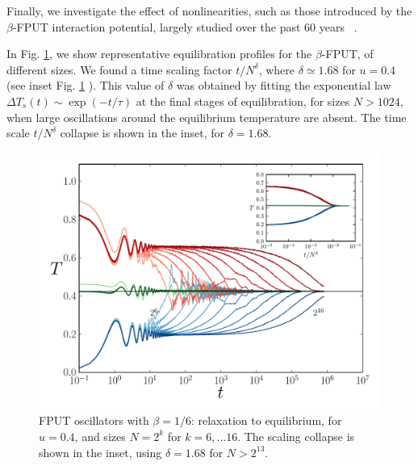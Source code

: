 \documentclass[aps,pre,showpacs,twocolumn,superscriptaddress,floatfix]{revtex4-1}
\begin{document}
Finally, we investigate the effect of nonlinearities, such as those introduced 
by the  $\beta$-FPUT interaction potential, 
largely studied over the past 60 years ~\cite{BermanIzrailev2005Report,Dauxois2008PhysToday}. 
{


In Fig. \ref{fig:TempLogt_FPU__U}, we show  representative   
equilibration profiles for  the $\beta$-FPUT, 
of different sizes.
%
We found a time scaling factor $t/N^\delta$, where $\delta \simeq 1.68 $ 
for $u =0.4$ (see inset Fig. \ref{fig:TempLogt_FPU__U} ).
%
This value of $\delta$ was obtained by fitting the exponential law 
$\Delta T_s(t) \sim \exp(-t/\tau)$ at the final stages of equilibration,  
%
for sizes $N>1024$,  
when large oscillations around the equilibrium temperature are absent. 
%
The time scale $t/N^\delta$ collapse is shown in the inset, for $\delta = 1.68$. 


\begin{figure}[h]
 \centering
 \includegraphics[width=1.0\linewidth]{TempLogt_FPU__U_0.4__Delta_1.68.pdf}
 \caption{FPUT oscillators with $\beta = 1/6$: relaxation to equilibrium, 
for $u=0.4$, and sizes $N=2^{k}$ for $k=6, \ldots 16$. 
%
The scaling collapse is shown in the inset, using $\delta = 1.68$ for $N>2^{13}$.
}
 \label{fig:TempLogt_FPU__U}
\end{figure}


}
\end{document}
